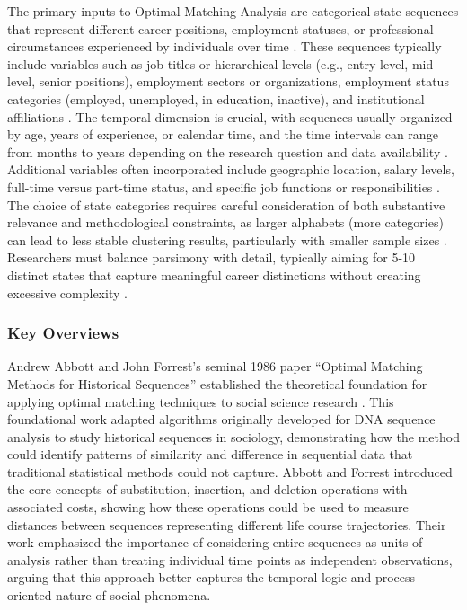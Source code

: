 \documentclass[../main.tex]{subfiles}
\begin{document}
The primary inputs to Optimal Matching Analysis are categorical state sequences that represent different career positions, employment statuses, or professional circumstances experienced by individuals over time \citep{sequence_analysis_wikipedia}. These sequences typically include variables such as job titles or hierarchical levels (e.g., entry-level, mid-level, senior positions), employment sectors or organizations, employment status categories (employed, unemployed, in education, inactive), and institutional affiliations \citep{mapping_career_patterns, vannoni_john_career_progression}. The temporal dimension is crucial, with sequences usually organized by age, years of experience, or calendar time, and the time intervals can range from months to years depending on the research question and data availability \citep{sequence_analysis_social_science}. Additional variables often incorporated include geographic location, salary levels, full-time versus part-time status, and specific job functions or responsibilities \citep{employment_status_mobility}. The choice of state categories requires careful consideration of both substantive relevance and methodological constraints, as larger alphabets (more categories) can lead to less stable clustering results, particularly with smaller sample sizes \citep{sequence_analysis_social_science}. Researchers must balance parsimony with detail, typically aiming for 5-10 distinct states that capture meaningful career distinctions without creating excessive complexity \citep{sequence_analysis_social_science}.

\subsubsection{Key Overviews}

Andrew Abbott and John Forrest's seminal 1986 paper ``Optimal Matching Methods for Historical Sequences'' established the theoretical foundation for applying optimal matching techniques to social science research \citep{abbott_forrest_1986}. This foundational work adapted algorithms originally developed for DNA sequence analysis to study historical sequences in sociology, demonstrating how the method could identify patterns of similarity and difference in sequential data that traditional statistical methods could not capture. Abbott and Forrest introduced the core concepts of substitution, insertion, and deletion operations with associated costs, showing how these operations could be used to measure distances between sequences representing different life course trajectories. Their work emphasized the importance of considering entire sequences as units of analysis rather than treating individual time points as independent observations, arguing that this approach better captures the temporal logic and process-oriented nature of social phenomena.
\end{document}
